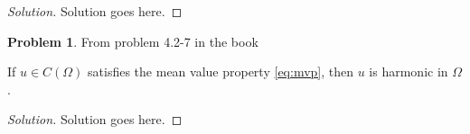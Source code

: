 \documentclass[11pt]{article}
\theoremstyle{definition}
\newtheorem{problem}{Problem}
\begin{document}
\begin{proof}[Solution]
Solution goes here.
\end{proof}

\begin{problem}
From problem 4.2-7 in the book

If $u \in C(\Omega)$ satisfies the mean value property \eqref{eq:mvp}, then $u$
is harmonic in $\Omega$.
\end{problem}

\begin{proof}[Solution]
Solution goes here.
\end{proof}
\end{document}
